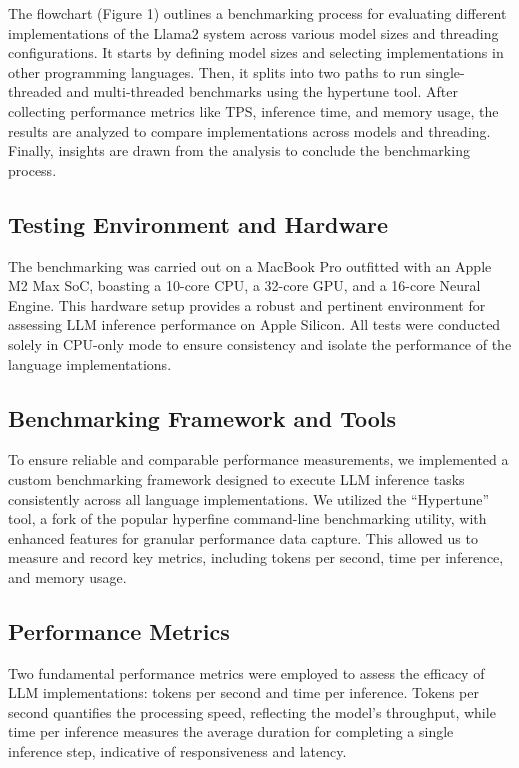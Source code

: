 \documentclass[sigconf]{acmart}
\begin{document}
The flowchart (Figure 1) outlines a benchmarking process for evaluating different implementations of the Llama2 system across various model sizes and threading configurations. It starts by defining model sizes and selecting implementations in other programming languages. Then, it splits into two paths to run single-threaded and multi-threaded benchmarks using the hypertune tool. After collecting performance metrics like TPS, inference time, and memory usage, the results are analyzed to compare implementations across models and threading. Finally, insights are drawn from the analysis to conclude the benchmarking process.


\subsection{Testing Environment and Hardware}
The benchmarking was carried out on a MacBook Pro outfitted with an Apple M2 Max SoC, boasting a 10-core CPU, a 32-core GPU, and a 16-core Neural Engine. This hardware setup provides a robust and pertinent environment for assessing LLM inference performance on Apple Silicon. All tests were conducted solely in CPU-only mode to ensure consistency and isolate the performance of the language implementations.

\subsection{Benchmarking Framework and Tools}
To ensure reliable and comparable performance measurements, we implemented a custom benchmarking framework designed to execute LLM inference tasks consistently across all language implementations. We utilized the “Hypertune” tool, a fork of the popular hyperfine command-line benchmarking utility, with enhanced features for granular performance data capture. This allowed us to measure and record key metrics, including tokens per second, time per inference, and memory usage.


\subsection{Performance Metrics}
Two fundamental performance metrics were employed to assess the efficacy of LLM implementations: tokens per second and time per inference. Tokens per second quantifies the processing speed, reflecting the model's throughput, while time per inference measures the average duration for completing a single inference step, indicative of responsiveness and latency.
\end{document}
